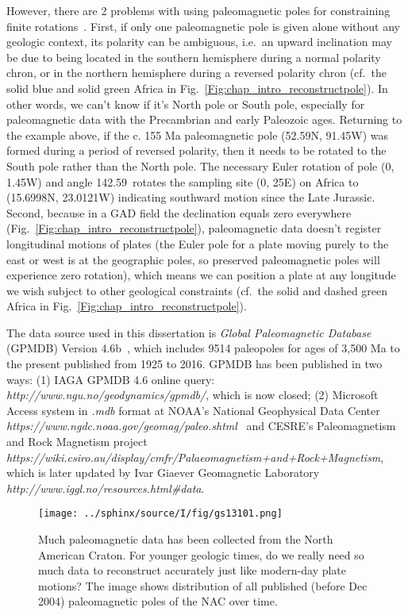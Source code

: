 However, there are 2 problems with using paleomagnetic poles for constraining
finite rotations~\cite{T19}. First, if only one paleomagnetic pole is
given alone without any geologic context, its polarity can be ambiguous, i.e.\
an upward inclination may be due to being located in the southern hemisphere
during a normal polarity chron, or in the northern hemisphere during a reversed
polarity chron (cf.\ the solid blue and solid green Africa in Fig.~\ref{Fig:chap_intro_reconstructpole}). In other words, we can't know if it's North pole
or South pole, especially for paleomagnetic data with the Precambrian and early
Paleozoic ages. Returning to the example above, if the c. 155 Ma paleomagnetic
pole (52.59\degree{}N, 91.45\degree{}W) was formed during a period of reversed polarity, then
it needs to be rotated to the South pole rather than the North pole. The
necessary Euler rotation of pole (0\degree, 1.45\degree{}W) and angle
142.59\degree\ rotates the sampling site (0\degree, 25\degree{}E) on Africa to
(15.6998\degree{}N, 23.0121\degree{}W) indicating
southward motion since the Late Jurassic. Second, because in a GAD field the
declination equals zero everywhere (Fig.~\ref{Fig:chap_intro_reconstructpole}),
paleomagnetic data doesn't register longitudinal motions of plates (the Euler
pole for a plate moving purely to the east or west is at the geographic poles,
so preserved paleomagnetic poles will experience zero rotation), which means we
can position a plate at any longitude we wish subject to other geological
constraints (cf.\ the solid and dashed green Africa in Fig.~\ref{Fig:chap_intro_reconstructpole}).

The data source used in this dissertation is \emph{Global Paleomagnetic
Database} (GPMDB) Version 4.6b~\cite{P05}, which includes 9514 paleopoles for
ages of 3,500 Ma to the present published from 1925 to 2016. GPMDB has been
published in two ways: (1) IAGA GPMDB 4.6 online query:
\emph{http://www.ngu.no/geodynamics/gpmdb/}, which is now closed; (2) Microsoft
Access system in \emph{.mdb} format at NOAA's National Geophysical Data Center
\emph{https://www.ngdc.noaa.gov/geomag/paleo.shtml}~\cite{P03}
and CESRE's Paleomagnetism and Rock Magnetism project
\emph{https://wiki.csiro.au/display/cmfr/Palaeomagnetism+and+Rock+Magnetism},
which is later updated by Ivar Giaever Geomagnetic Laboratory
\emph{http://www.iggl.no/resources.html\#data}.

\begin{figure}
    \centering
        \texttt{[image: ../sphinx/source/I/fig/gs13101.png]}
    \captionsetup{width=.95\textwidth}
    \caption{Much paleomagnetic data has been collected from the North American Craton.
    For younger geologic times, do we really need so much data to reconstruct
    accurately just like modern-day plate motions? The image shows distribution
    of all published (before Dec 2004) paleomagnetic poles of the NAC over
	time.}\label{Fig:chap_intro_nacpole}
\end{figure}


